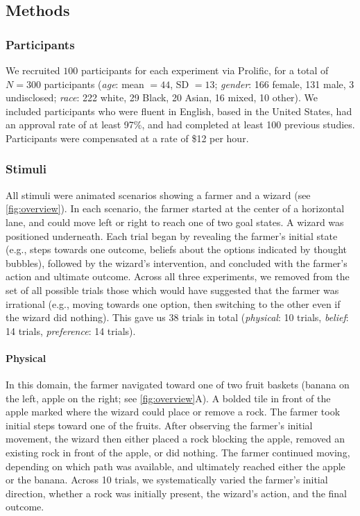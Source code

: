 \documentclass[10pt,letterpaper]{article}
\begin{document}
\subsection{Methods}

\subsubsection{Participants}

We recruited $100$ participants for each experiment via Prolific, for a total of $N=300$ participants (\emph{age}: mean $=44$, SD $=13$; \emph{gender}: 166 female, 131 male, 3 undisclosed; \emph{race}: 222 white, 29 Black, 20 Asian, 16 mixed, 10 other). 
We included participants who were fluent in English, based in the United States, had an approval rate of at least 97\%, and had completed at least 100 previous studies.
Participants were compensated at a rate of \$12 per hour.


\subsubsection{Stimuli}

All stimuli were animated scenarios showing a farmer and a wizard (see \autoref{fig:overview}). 
In each scenario, the farmer started at the center of a horizontal lane, and could move left or right to reach one of two goal states. A wizard was positioned underneath.
Each trial began by revealing the farmer's initial state (e.g., steps towards one outcome, beliefs about the options indicated by thought bubbles), followed by the wizard's intervention, and concluded with the farmer's action and ultimate outcome.
Across all three experiments, we removed from the set of all possible trials those which would have suggested that the farmer was irrational (e.g., moving towards one option, then switching to the other even if the wizard did nothing).
This gave us $38$ trials in total (\textit{physical}: 10 trials, \textit{belief}: 14 trials, \textit{preference}: 14 trials). 

\paragraph{Physical}

In this domain, the farmer navigated toward one of two fruit baskets (banana on the left, apple on the right; see \autoref{fig:overview}A). 
A bolded tile in front of the apple marked where the wizard could place or remove a rock.
The farmer took initial steps toward one of the fruits.
After observing the farmer's initial movement, the wizard then either placed a rock blocking the apple, removed an existing rock in front of the apple, or did nothing.
The farmer continued moving, depending on which path was available, and ultimately reached either the apple or the banana.
Across 10 trials, we systematically varied the farmer's initial direction, whether a rock was initially present, the wizard's action, and the final outcome.
\end{document}
